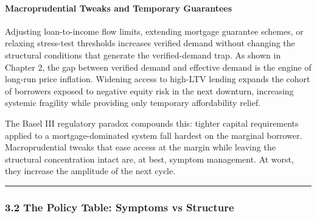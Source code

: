 \paragraph{Macroprudential Tweaks and Temporary
Guarantees}\label{macroprudential-tweaks-and-temporary-guarantees}

Adjusting loan-to-income flow limits, extending mortgage guarantee
schemes, or relaxing stress-test thresholds increases verified demand
without changing the structural conditions that generate the
verified-demand trap. As shown in Chapter 2, the gap between verified
demand and effective demand is the engine of long-run price inflation.
Widening access to high-LTV lending expands the cohort of borrowers
exposed to negative equity risk in the next downturn, increasing
systemic fragility while providing only temporary affordability relief.

The Basel III regulatory paradox compounds this: tighter capital
requirements applied to a mortgage-dominated system fall hardest on the
marginal borrower. Macroprudential tweaks that ease access at the margin
while leaving the structural concentration intact are, at best, symptom
management. At worst, they increase the amplitude of the next cycle.

\begin{center}\rule{0.5\linewidth}{0.5pt}\end{center}

\subsubsection{3.2 The Policy Table: Symptoms vs
Structure}\label{the-policy-table-symptoms-vs-structure}

